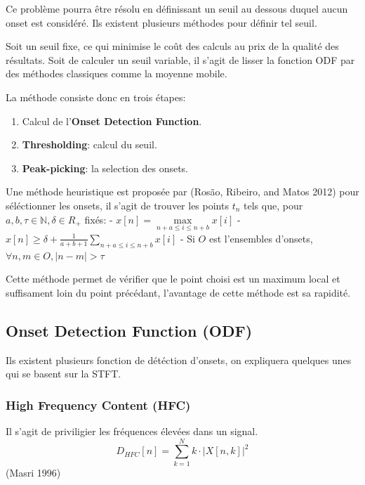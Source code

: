 \documentclass[]{article}
\providecommand{\tightlist}{%
  \setlength{\itemsep}{0pt}\setlength{\parskip}{0pt}}
\begin{document}
Ce problème pourra être résolu en définissant un seuil au dessous duquel
aucun onset est considéré. Ils existent plusieurs méthodes pour définir
tel seuil.

Soit un seuil fixe, ce qui minimise le coût des calculs au prix de la
qualité des résultats. Soit de calculer un seuil variable, il s'agit de
lisser la fonction ODF par des méthodes classiques comme la moyenne
mobile.

La méthode consiste donc en trois étapes:

\begin{enumerate}
\def\labelenumi{\arabic{enumi}.}
\tightlist
\item
  Calcul de l'\textbf{Onset Detection Function}.
\item
  \textbf{Thresholding}: calcul du seuil.
\item
  \textbf{Peak-picking}: la selection des onsets.
\end{enumerate}

Une méthode heuristique est proposée par (Rosão, Ribeiro, and Matos
2012) pour séléctionner les onsets, il s'agit de trouver les points
\(t_n\) tels que, pour \(a,b,\tau\in\mathbb{N}, \delta\in{R_+}\) fixés:
- \(x[n] = \max\limits_{n+a \leq i\leq n + b} x[i]\) -
\(x[n] \geq \delta + \frac{1}{a+b+1}\sum\limits_{n+a \leq i\leq n + b} x[i]\)
- Si \(O\) est l'ensembles d'onsets,
\(\forall n,m\in O, \lvert n - m \rvert > \tau\)

Cette méthode permet de vérifier que le point choisi est un maximum
local et suffisament loin du point précédant, l'avantage de cette
méthode est sa rapidité.

\hypertarget{onset-detection-function-odf}{%
\subsection{Onset Detection Function
(ODF)}\label{onset-detection-function-odf}}

Ils existent plusieurs fonction de détéction d'onsets, on expliquera
quelques unes qui se basent sur la STFT.

\hypertarget{high-frequency-content-hfc}{%
\subsubsection{High Frequency Content
(HFC)}\label{high-frequency-content-hfc}}

Il s'agit de priviligier les fréquences élevées dans un signal.
\[ D_{HFC}[n] = \sum\limits_{k=1}^{N}k\cdot\left\lvert X[n,k]\right\rvert^2 \]
(Masri 1996)
\end{document}
